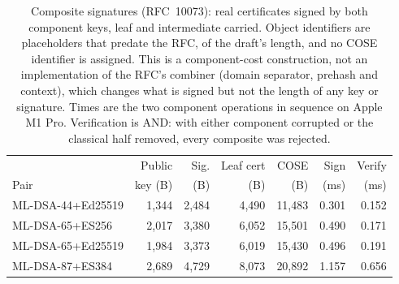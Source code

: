 \begin{table}[ht]
\caption{Composite signatures (RFC~10073): real certificates signed by both component keys, leaf and intermediate carried. Object identifiers are placeholders that predate the RFC, of the draft's length, and no COSE identifier is assigned. This is a component-cost construction, not an implementation of the RFC's combiner (domain separator, prehash and context), which changes what is signed but not the length of any key or signature. Times are the two component operations in sequence on Apple M1 Pro. Verification is AND: with either component corrupted or the classical half removed, every composite was rejected.}
\label{tab:composite}
\small
\begin{tabular}{lrrrrrr}
\toprule
 & Public & Sig. & Leaf cert & COSE & Sign & Verify\\
Pair & key (B) & (B) & (B) & (B) & (ms) & (ms)\\
\midrule
ML-DSA-44+Ed25519 & 1,344 & 2,484 & 4,490 & 11,483 & 0.301 & 0.152\\
ML-DSA-65+ES256 & 2,017 & 3,380 & 6,052 & 15,501 & 0.490 & 0.171\\
ML-DSA-65+Ed25519 & 1,984 & 3,373 & 6,019 & 15,430 & 0.496 & 0.191\\
ML-DSA-87+ES384 & 2,689 & 4,729 & 8,073 & 20,892 & 1.157 & 0.656\\
\bottomrule
\end{tabular}
\end{table}
